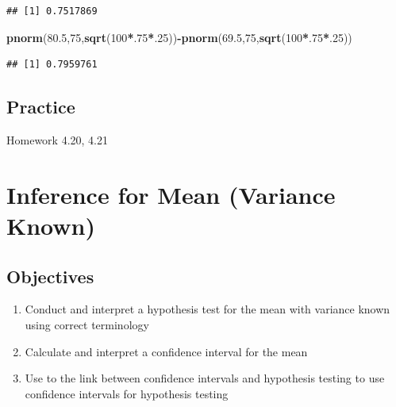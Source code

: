 \documentclass[]{book}
\newenvironment{Shaded}{\begin{snugshade}}{\end{snugshade}}
\newcommand{\KeywordTok}[1]{\textcolor[rgb]{0.13,0.29,0.53}{\textbf{#1}}}
\newcommand{\DecValTok}[1]{\textcolor[rgb]{0.00,0.00,0.81}{#1}}
\newcommand{\FloatTok}[1]{\textcolor[rgb]{0.00,0.00,0.81}{#1}}
\newcommand{\OperatorTok}[1]{\textcolor[rgb]{0.81,0.36,0.00}{\textbf{#1}}}
\newcommand{\NormalTok}[1]{#1}
\providecommand{\tightlist}{%
  \setlength{\itemsep}{0pt}\setlength{\parskip}{0pt}}
\theoremstyle{definition}
\theoremstyle{definition}
\theoremstyle{definition}
\theoremstyle{remark}
\begin{document}
\begin{verbatim}
## [1] 0.7517869
\end{verbatim}

\begin{Shaded}
\begin{Highlighting}[]
\KeywordTok{pnorm}\NormalTok{(}\FloatTok{80.5}\NormalTok{,}\DecValTok{75}\NormalTok{,}\KeywordTok{sqrt}\NormalTok{(}\DecValTok{100}\OperatorTok{*}\NormalTok{.}\DecValTok{75}\OperatorTok{*}\NormalTok{.}\DecValTok{25}\NormalTok{))}\OperatorTok{-}\KeywordTok{pnorm}\NormalTok{(}\FloatTok{69.5}\NormalTok{,}\DecValTok{75}\NormalTok{,}\KeywordTok{sqrt}\NormalTok{(}\DecValTok{100}\OperatorTok{*}\NormalTok{.}\DecValTok{75}\OperatorTok{*}\NormalTok{.}\DecValTok{25}\NormalTok{))}
\end{Highlighting}
\end{Shaded}

\begin{verbatim}
## [1] 0.7959761
\end{verbatim}

\subsection{Practice}\label{practice-8}

Homework 4.20, 4.21

\hypertarget{L21}{\section{Inference for Mean (Variance
Known)}\label{L21}}

\subsection{Objectives}\label{objectives-20}

\begin{enumerate}
\def\labelenumi{\arabic{enumi})}
\tightlist
\item
  Conduct and interpret a hypothesis test for the mean with variance
  known using correct terminology\\
\item
  Calculate and interpret a confidence interval for the mean\\
\item
  Use to the link between confidence intervals and hypothesis testing to
  use confidence intervals for hypothesis testing
\end{enumerate}
\end{document}
